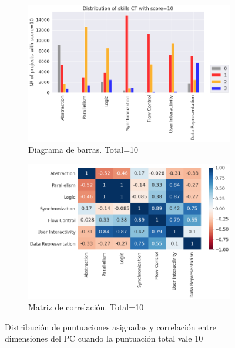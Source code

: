 \documentclass[a4paper, 12pt]{book}
\begin{document}
\begin{figure}[H]
    \centering
    \begin{subfigure}[h]{.49\textwidth} 
        \includegraphics[width=\textwidth]{img/distribucion_10_Scratch}
        \caption{Diagrama de barras. Total=10}
        \label{fig:total10}
    \end{subfigure}       
    \begin{subfigure}[h]{.49\textwidth} 
        \includegraphics[width=\textwidth]{img/corr_10_Scratch}
        \caption{Matriz de correlación. Total=10}
        \label{fig:corr10}
    \end{subfigure}
     \caption{Distribución de puntuaciones asignadas y correlación entre dimensiones del PC cuando la puntuación total vale 10}
\end{figure}
\end{document}
